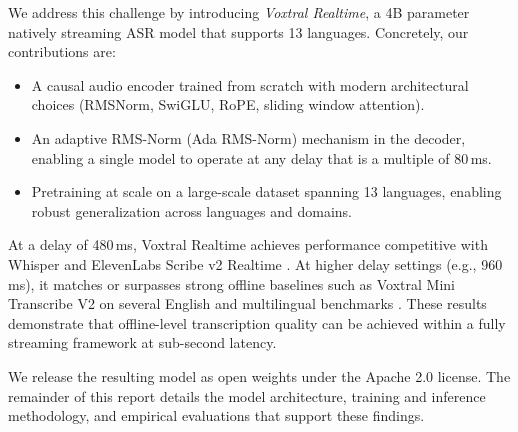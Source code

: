 We address this challenge by introducing \emph{Voxtral Realtime}, a 4B parameter natively streaming ASR model that supports 13 languages. %
Concretely, our contributions are:
\begin{itemize}
    \item A causal audio encoder trained from scratch with modern architectural choices (RMSNorm, SwiGLU, RoPE, sliding window attention).%
    \item An adaptive RMS-Norm (Ada RMS-Norm) mechanism in the decoder, enabling a single model to operate at any delay that is a multiple of 80\,ms.
    \item Pretraining at scale on a large-scale dataset spanning 13 languages, enabling robust generalization across languages and domains.
\end{itemize}

 At a delay of 480\,ms, Voxtral Realtime achieves performance competitive with Whisper \citep{radford2023whisper} and ElevenLabs Scribe v2 Realtime \citep{scribev22025}. At higher delay settings (e.g., 960\,ms), it matches or surpasses strong offline baselines such as Voxtral Mini Transcribe V2 on several English and multilingual benchmarks \citep{voxtral22026}. These results demonstrate that offline-level transcription quality can be achieved within a fully streaming framework at sub-second latency.

We release the resulting model as open weights under the Apache 2.0 license. The remainder of this report details the model architecture, training and inference methodology, and empirical evaluations that support these findings.
